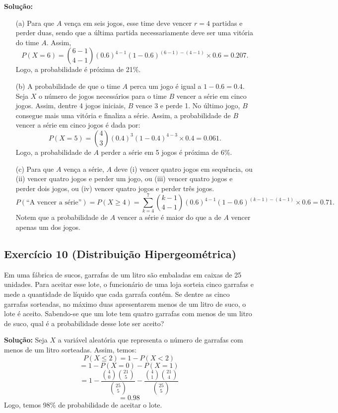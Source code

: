 \documentclass{article}
\begin{document}
\vspace{0.5cm}
\textbf{Solução:} 
\begin{enumerate}
    \item[(a)] Para que $A$ vença em seis jogos, esse time deve vencer $r = 4$ partidas e perder duas, sendo que a última partida necessariamente deve ser uma vitória do time $A$. Assim,
    $$
    P(X = 6) = \binom{6-1}{4-1}(0.6)^{4-1}(1-0.6)^{(6-1)-(4-1)} \times 0.6 = 0.207.
    $$
    Logo, a probabilidade é próxima de 21\%.
    \item[(b)] A probabilidade de que o time $A$ perca um jogo é igual a $1-0.6=0.4$. Seja $X$ o número de jogos necessários para o time $B$ vencer a série em cinco jogos. Assim, dentre 4 jogos iniciais, $B$ vence 3 e perde 1. No último jogo, $B$ consegue mais uma vitória e finaliza a série. Assim, a probabilidade de $B$ vencer a série em cinco jogos é dada por:
    $$
    P(X = 5) = \binom{4}{3}(0.4)^3(1-0.4)^{4-3} \times 0.4 = 0.061.
    $$
    Logo, a probabilidade de $A$ perder a série em 5 jogos é próxima de 6\%.
    \item[(c)] Para que $A$ vença a série, $A$ deve (i) vencer quatro jogos em sequência, ou (ii) vencer quatro jogos e perder um jogo, ou (iii) vencer quatro jogos e perder dois jogos, ou (iv) vencer quatro jogos e perder três jogos.
    $$
    P(\text{``A vencer a série''}) = P(X \geq 4) 
    = \sum_{k=4}^{7} \binom{k-1}{4-1}(0.6)^{4-1}(1-0.6)^{(k-1)-(4-1)} \times 0.6 
    = 0.71.
    $$
    Notem que a probabilidade de $A$ vencer a série é maior do que a de $A$ vencer apenas um dos jogos.
\end{enumerate}

\subsection{Exercício 10 (Distribuição Hipergeométrica)}
Em uma fábrica de sucos, garrafas de um litro são embaladas em caixas de 25 unidades. Para aceitar esse lote, o funcionário de uma loja sorteia cinco garrafas e mede a quantidade de líquido que cada garrafa contém. Se dentre as cinco garrafas sorteadas, no máximo duas apresentarem menos de um litro de suco, o lote é aceito. Sabendo-se que um lote tem quatro garrafas com menos de um litro de suco, qual é a probabilidade desse lote ser aceito?

\vspace{0.5cm}
\textbf{Solução:} Seja $X$ a variável aleatória que representa o número de garrafas com menos de um litro sorteadas. Assim, temos:
    $$
    P(X \le 2) = 1 - P(X < 2)
    $$
    $$
    = 1 - P(X = 0) - P(X = 1)
    $$
    $$
    = 1 - \frac{\binom{4}{0}\binom{21}{5}}{\binom{25}{5}} - \frac{\binom{4}{1}\binom{21}{4}}{\binom{25}{5}}
    $$   
    $$
    = 0.98
    $$
Logo, temos 98\% de probabilidade de aceitar o lote.
\end{document}
